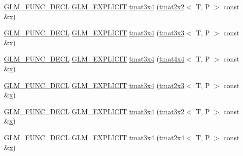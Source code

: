 \begin{DoxyCompactItemize}
\item 
\mbox{\hyperlink{setup_8hpp_ab2d052de21a70539923e9bcbf6e83a51}{G\+L\+M\+\_\+\+F\+U\+N\+C\+\_\+\+D\+E\+CL}} \mbox{\hyperlink{setup_8hpp_a6c74f5a5e7b134ab69023ff9a30d4d5d}{G\+L\+M\+\_\+\+E\+X\+P\+L\+I\+C\+IT}} \mbox{\hyperlink{structglm_1_1tmat3x4_a0ed0439eeabeb33a938b5c1fa0d863b9}{tmat3x4}} (\mbox{\hyperlink{structglm_1_1tmat2x2}{tmat2x2}}$<$ T, P $>$ const \&\mbox{\hyperlink{glad_8h_a92d0386e5c19fb81ea88c9f99644ab1d}{x}})
\item 
\mbox{\hyperlink{setup_8hpp_ab2d052de21a70539923e9bcbf6e83a51}{G\+L\+M\+\_\+\+F\+U\+N\+C\+\_\+\+D\+E\+CL}} \mbox{\hyperlink{setup_8hpp_a6c74f5a5e7b134ab69023ff9a30d4d5d}{G\+L\+M\+\_\+\+E\+X\+P\+L\+I\+C\+IT}} \mbox{\hyperlink{structglm_1_1tmat3x4_a03d2fae8e2bee08e4cff77f26f674be8}{tmat3x4}} (\mbox{\hyperlink{structglm_1_1tmat3x3}{tmat3x3}}$<$ T, P $>$ const \&\mbox{\hyperlink{glad_8h_a92d0386e5c19fb81ea88c9f99644ab1d}{x}})
\item 
\mbox{\hyperlink{setup_8hpp_ab2d052de21a70539923e9bcbf6e83a51}{G\+L\+M\+\_\+\+F\+U\+N\+C\+\_\+\+D\+E\+CL}} \mbox{\hyperlink{setup_8hpp_a6c74f5a5e7b134ab69023ff9a30d4d5d}{G\+L\+M\+\_\+\+E\+X\+P\+L\+I\+C\+IT}} \mbox{\hyperlink{structglm_1_1tmat3x4_af6107faa14e8655813db0fc464242ae9}{tmat3x4}} (\mbox{\hyperlink{structglm_1_1tmat4x4}{tmat4x4}}$<$ T, P $>$ const \&\mbox{\hyperlink{glad_8h_a92d0386e5c19fb81ea88c9f99644ab1d}{x}})
\item 
\mbox{\hyperlink{setup_8hpp_ab2d052de21a70539923e9bcbf6e83a51}{G\+L\+M\+\_\+\+F\+U\+N\+C\+\_\+\+D\+E\+CL}} \mbox{\hyperlink{setup_8hpp_a6c74f5a5e7b134ab69023ff9a30d4d5d}{G\+L\+M\+\_\+\+E\+X\+P\+L\+I\+C\+IT}} \mbox{\hyperlink{structglm_1_1tmat3x4_a15f3fac4d543da49854067add7993dc9}{tmat3x4}} (\mbox{\hyperlink{structglm_1_1tmat2x3}{tmat2x3}}$<$ T, P $>$ const \&\mbox{\hyperlink{glad_8h_a92d0386e5c19fb81ea88c9f99644ab1d}{x}})
\item 
\mbox{\hyperlink{setup_8hpp_ab2d052de21a70539923e9bcbf6e83a51}{G\+L\+M\+\_\+\+F\+U\+N\+C\+\_\+\+D\+E\+CL}} \mbox{\hyperlink{setup_8hpp_a6c74f5a5e7b134ab69023ff9a30d4d5d}{G\+L\+M\+\_\+\+E\+X\+P\+L\+I\+C\+IT}} \mbox{\hyperlink{structglm_1_1tmat3x4_ab235cb72196b66b354ca6db5b3de36ab}{tmat3x4}} (\mbox{\hyperlink{structglm_1_1tmat3x2}{tmat3x2}}$<$ T, P $>$ const \&\mbox{\hyperlink{glad_8h_a92d0386e5c19fb81ea88c9f99644ab1d}{x}})
\item 
\mbox{\hyperlink{setup_8hpp_ab2d052de21a70539923e9bcbf6e83a51}{G\+L\+M\+\_\+\+F\+U\+N\+C\+\_\+\+D\+E\+CL}} \mbox{\hyperlink{setup_8hpp_a6c74f5a5e7b134ab69023ff9a30d4d5d}{G\+L\+M\+\_\+\+E\+X\+P\+L\+I\+C\+IT}} \mbox{\hyperlink{structglm_1_1tmat3x4_adb7f132c93b8d8fcdbd577898d77f7b8}{tmat3x4}} (\mbox{\hyperlink{structglm_1_1tmat2x4}{tmat2x4}}$<$ T, P $>$ const \&\mbox{\hyperlink{glad_8h_a92d0386e5c19fb81ea88c9f99644ab1d}{x}})

\end{DoxyCompactItemize}
